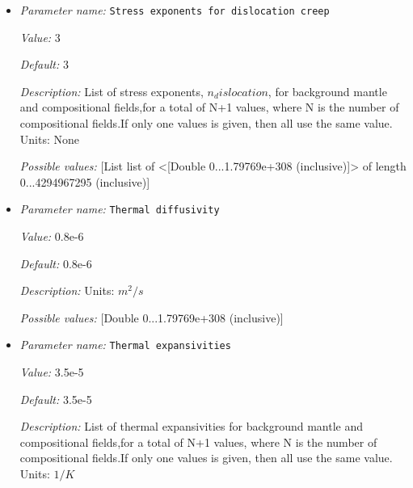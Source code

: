 \begin{itemize}
{\it Value:} 1e22


{\it Default:} 1e22


{\it Description:} Reference viscosity for nondimensionalization. Units $Pa s$


{\it Possible values:} [Double 0...1.79769e+308 (inclusive)]
\item {\it Parameter name:} {\tt Stress exponents for dislocation creep}
\label{parameters:Material model/DiffusionDislocation/Stress exponents for dislocation creep}


{\it Value:} 3


{\it Default:} 3


{\it Description:} List of stress exponents, $n_dislocation$, for background mantle and compositional fields,for a total of N+1 values, where N is the number of compositional fields.If only one values is given, then all use the same value.  Units: None


{\it Possible values:} [List list of <[Double 0...1.79769e+308 (inclusive)]> of length 0...4294967295 (inclusive)]
\item {\it Parameter name:} {\tt Thermal diffusivity}
\label{parameters:Material model/DiffusionDislocation/Thermal diffusivity}


{\it Value:} 0.8e-6


{\it Default:} 0.8e-6


{\it Description:} Units: $m^2/s$


{\it Possible values:} [Double 0...1.79769e+308 (inclusive)]
\item {\it Parameter name:} {\tt Thermal expansivities}
\label{parameters:Material model/DiffusionDislocation/Thermal expansivities}


{\it Value:} 3.5e-5


{\it Default:} 3.5e-5


{\it Description:} List of thermal expansivities for background mantle and compositional fields,for a total of N+1 values, where N is the number of compositional fields.If only one values is given, then all use the same value.  Units: $1 / K$



\end{itemize}
